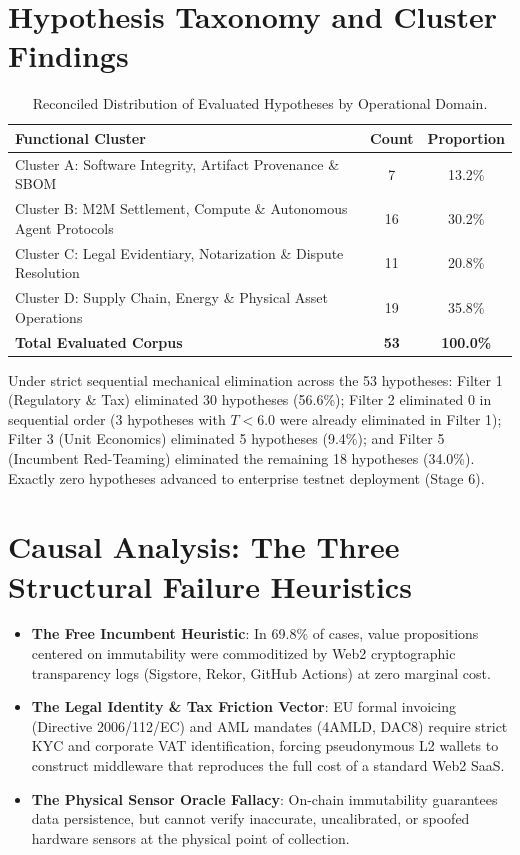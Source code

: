\documentclass[10pt,a4paper]{article}
\begin{document}
\section{Hypothesis Taxonomy and Cluster Findings}
\begin{table}[h]
\centering
\caption{Reconciled Distribution of Evaluated Hypotheses by Operational Domain.}
\begin{tabular}{lcc}
\toprule
\textbf{Functional Cluster} & \textbf{Count} & \textbf{Proportion} \\
\midrule
Cluster A: Software Integrity, Artifact Provenance \& SBOM & 7 & 13.2\% \\
Cluster B: M2M Settlement, Compute \& Autonomous Agent Protocols & 16 & 30.2\% \\
Cluster C: Legal Evidentiary, Notarization \& Dispute Resolution & 11 & 20.8\% \\
Cluster D: Supply Chain, Energy \& Physical Asset Operations & 19 & 35.8\% \\
\midrule
\textbf{Total Evaluated Corpus} & \textbf{53} & \textbf{100.0\%} \\
\bottomrule
\end{tabular}
\end{table}

\noindent Under strict sequential mechanical elimination across the 53 hypotheses: Filter 1 (Regulatory \& Tax) eliminated 30 hypotheses (56.6\%); Filter 2 eliminated 0 in sequential order (3 hypotheses with $T < 6.0$ were already eliminated in Filter 1); Filter 3 (Unit Economics) eliminated 5 hypotheses (9.4\%); and Filter 5 (Incumbent Red-Teaming) eliminated the remaining 18 hypotheses (34.0\%). Exactly zero hypotheses advanced to enterprise testnet deployment (Stage 6).

\section{Causal Analysis: The Three Structural Failure Heuristics}
\begin{itemize}
    \item \textbf{The Free Incumbent Heuristic}: In 69.8\% of cases, value propositions centered on immutability were commoditized by Web2 cryptographic transparency logs (Sigstore, Rekor, GitHub Actions) at zero marginal cost.
    \item \textbf{The Legal Identity \& Tax Friction Vector}: EU formal invoicing (Directive 2006/112/EC) and AML mandates (4AMLD, DAC8) require strict KYC and corporate VAT identification, forcing pseudonymous L2 wallets to construct middleware that reproduces the full cost of a standard Web2 SaaS.
    \item \textbf{The Physical Sensor Oracle Fallacy}: On-chain immutability guarantees data persistence, but cannot verify inaccurate, uncalibrated, or spoofed hardware sensors at the physical point of collection.
\end{itemize}
\end{document}
